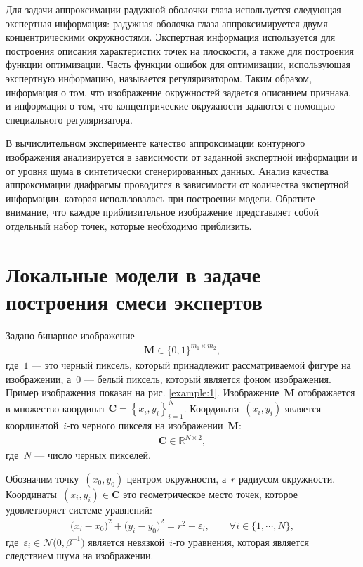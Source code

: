 Для задачи аппроксимации радужной оболочки глаза используется следующая экспертная информация: радужная оболочка глаза аппроксимируется двумя концентрическими окружностями. Экспертная информация используется для построения описания характеристик точек на плоскости, а также для построения функции оптимизации. Часть функции ошибок для оптимизации, использующая экспертную информацию, называется регуляризатором. Таким образом, информация о том, что изображение окружностей задается описанием признака, и информация о том, что концентрические окружности задаются с помощью специального регуляризатора.

В вычислительном эксперименте качество аппроксимации контурного изображения анализируется в зависимости от заданной экспертной информации и от уровня шума в синтетически сгенерированных данных. Анализ качества аппроксимации диафрагмы проводится в зависимости от количества экспертной информации, которая использовалась при построении модели. Обратите внимание, что каждое приблизительное изображение представляет собой отдельный набор точек, которые необходимо приблизить.

\section{Локальные модели в задаче построения смеси экспертов}
Задано бинарное изображение
\[
\label{eq:st:cr:1}
\begin{aligned}
\textbf{M} \in \{0,1\}^{m_1 \times m_2},
\end{aligned}
\]
где~$1$ --- это черный пиксель, который принадлежит рассматриваемой фигуре на изображении, а~$0$ --- белый пиксель, который является фоном изображения. 
Пример изображения показан на рис. \ref{example:1}.
Изображение~$\textbf{M}$ отображается в множество координат \mbox{$\textbf{C}=\left\{x_i, y_i\right\}_{i=1}^{N}$}. Координата~$(x_i, y_i)$ является координатой~$i$-го черного пикселя на изображении~$\textbf{M}$:
\[
\label{eq:st:cr:2}
\begin{aligned}
\textbf{C} \in  \mathbb{R}^{N \times 2},
\end{aligned}
\]
где~$N$ --- число черных пикселей.

Обозначим точку~$(x_0, y_0)$ центром окружности, а~$r$ радиусом окружности.
Координаты~$\left(x_i, y_i\right)\in\textbf{C}$ это геометрическое место точек, которое удовлетворяет системе уравнений:
\[
\label{eq:st:cr:3}
\begin{aligned}
\bigr(x_i - x_0\bigr)^{2}+\bigr(y_i-y_0\bigr)^2 = r^2 + \varepsilon_i, \qquad \forall i \in \{1, \cdots, N\},
\end{aligned}
\]
где~$\varepsilon_i \in \mathcal{N}\bigr(0, \beta^{-1}\bigr)$ является невязкой~$i$-го уравнения, которая является следствием шума на изображении.

